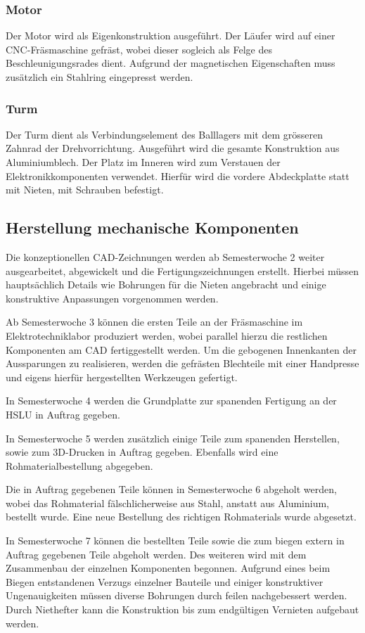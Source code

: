 \subsubsection{Motor}
Der Motor wird als Eigenkonstruktion ausgeführt. Der Läufer wird auf einer CNC-Fräsmaschine gefräst, wobei dieser sogleich als Felge des 
Beschleunigungsrades dient. Aufgrund der magnetischen Eigenschaften muss zusätzlich ein Stahlring eingepresst werden.

\subsubsection{Turm}
Der Turm dient als Verbindungselement des Balllagers mit dem grösseren 
Zahnrad der Drehvorrichtung. Ausgeführt wird die gesamte Konstruktion aus Aluminiumblech. Der Platz im Inneren wird zum Verstauen der 
Elektronikkomponenten verwendet. Hierfür wird die vordere Abdeckplatte statt mit Nieten, mit Schrauben befestigt.


\subsection{Herstellung mechanische Komponenten}
Die konzeptionellen CAD-Zeichnungen werden ab Semesterwoche 2 weiter 
ausgearbeitet, abgewickelt und die Fertigungszeichnungen erstellt. Hierbei müssen hauptsächlich Details wie Bohrungen für die Nieten angebracht und einige konstruktive Anpassungen vorgenommen werden. 

Ab Semesterwoche 3 können die ersten Teile an der Fräsmaschine im Elektrotechniklabor produziert werden, wobei parallel  hierzu die restlichen Komponenten am CAD fertiggestellt werden.
Um die gebogenen Innenkanten der Aussparungen zu realisieren, werden die gefrästen Blechteile mit einer Handpresse und eigens hierfür hergestellten Werkzeugen gefertigt.

In Semesterwoche 4 werden die Grundplatte zur spanenden Fertigung an der HSLU in Auftrag gegeben.

In Semesterwoche 5 werden zusätzlich einige Teile zum spanenden Herstellen, sowie zum 3D-Drucken in Auftrag gegeben. Ebenfalls wird eine Rohmaterialbestellung abgegeben.

Die in Auftrag gegebenen Teile können in Semesterwoche 6 abgeholt werden, wobei das  Rohmaterial fälschlicherweise aus Stahl, anstatt aus Aluminium, bestellt wurde. Eine neue Bestellung des richtigen Rohmaterials wurde abgesetzt.

In Semesterwoche 7 können die bestellten Teile sowie die zum biegen extern in Auftrag gegebenen Teile abgeholt werden. Des weiteren wird mit dem Zusammenbau der einzelnen Komponenten begonnen. Aufgrund eines beim Biegen entstandenen Verzugs einzelner Bauteile und einiger konstruktiver Ungenauigkeiten müssen diverse Bohrungen durch feilen nachgebessert werden. Durch Niethefter kann die Konstruktion bis zum endgültigen Vernieten aufgebaut werden.

